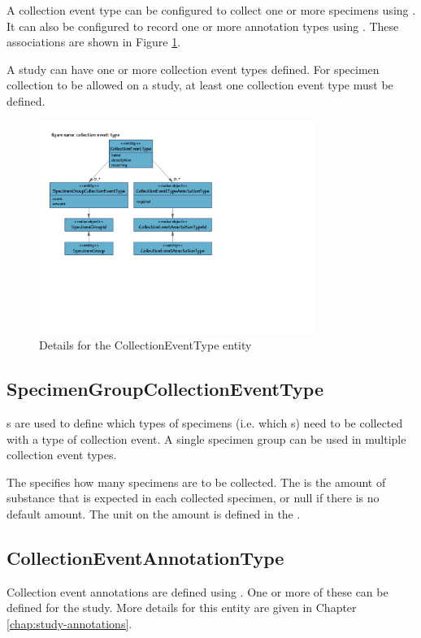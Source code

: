 A collection event type can be configured to collect one or more specimens using
. It can also be configured to
record one or more annotation types using
. These associations are shown in
Figure \ref{fig:collection-event-type}.

A study can have one or more collection event types defined. For specimen
collection to be allowed on a study, at least one collection event type must be
defined.

\begin{figure}[H]
  \centering
  \includegraphics[trim={9mm 80mm 96mm 18mm}, clip,
    width=0.8\textwidth]{images/collection-event-type}
  \caption{Details for the CollectionEventType entity}
  \label{fig:collection-event-type}
\end{figure}

\subsection*{SpecimenGroupCollectionEventType}

s are used to define which types
of specimens (i.e. which s) need to be collected with
a type of collection event. A single specimen group can be used in multiple
collection event types.

The  specifies how many specimens are to be collected. The
 is the amount of substance that is expected in each collected
specimen, or null if there is no default amount. The unit on the amount is
defined in the .

\subsection*{CollectionEventAnnotationType}
Collection event annotations are defined using
. One or more of these can be
defined for the study. More details for this entity are given in Chapter
\ref{chap:study-annotations}.

